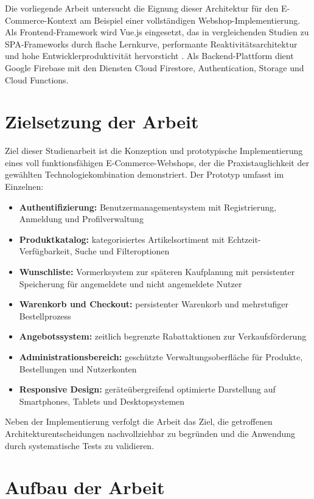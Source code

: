 Die vorliegende Arbeit untersucht die Eignung dieser Architektur für den E-Commerce-Kontext am Beispiel einer vollständigen Webshop-Implementierung. Als Frontend-Framework wird Vue.js eingesetzt, das in vergleichenden Studien zu SPA-Frameworks durch flache Lernkurve, performante Reaktivitätsarchitektur und hohe Entwicklerproduktivität hervorsticht \cite{emmanni2023}. Als Backend-Plattform dient Google Firebase mit den Diensten Cloud Firestore, Authentication, Storage und Cloud Functions.

\section{Zielsetzung der Arbeit}
\label{sec:zielsetzung}

Ziel dieser Studienarbeit ist die Konzeption und prototypische Implementierung eines voll funktionsfähigen E-Commerce-Webshops, der die Praxistauglichkeit der gewählten Technologiekombination demonstriert. Der Prototyp umfasst im Einzelnen:

\begin{itemize}
    \item \textbf{Authentifizierung:} Benutzermanagementsystem mit Registrierung, Anmeldung und Profilverwaltung
    \item \textbf{Produktkatalog:} kategorisiertes Artikelsortiment mit Echtzeit-Verfügbarkeit, Suche und Filteroptionen
    \item \textbf{Wunschliste:} Vormerksystem zur späteren Kaufplanung mit persistenter Speicherung für angemeldete und nicht angemeldete Nutzer
    \item \textbf{Warenkorb und Checkout:} persistenter Warenkorb und mehrstufiger Bestellprozess
    \item \textbf{Angebotssystem:} zeitlich begrenzte Rabattaktionen zur Verkaufsförderung
    \item \textbf{Administrationsbereich:} geschützte Verwaltungsoberfläche für Produkte, Bestellungen und Nutzerkonten
    \item \textbf{Responsive Design:} geräteübergreifend optimierte Darstellung auf Smartphones, Tablets und Desktopsystemen
\end{itemize}

Neben der Implementierung verfolgt die Arbeit das Ziel, die getroffenen Architekturentscheidungen nachvollziehbar zu begründen und die Anwendung durch systematische Tests zu validieren.

\section{Aufbau der Arbeit}
\label{sec:aufbau}


